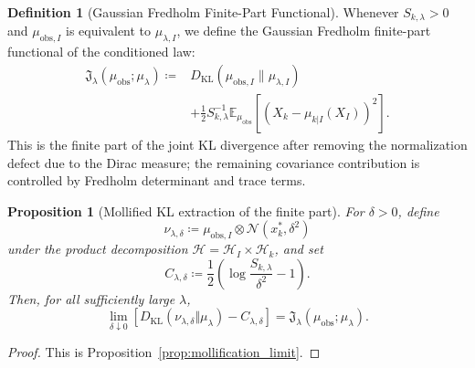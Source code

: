 \documentclass[preprint,12pt]{elsarticle}
\theoremstyle{plain}
\newtheorem{proposition}[theorem]{Proposition}
\theoremstyle{definition}
\newtheorem{definition}[theorem]{Definition}
\theoremstyle{remark}
\newcommand{\KL}{D_{\operatorname{KL}}}
\newcommand{\E}{\mathbb{E}}
\begin{document}
    \begin{definition}[Gaussian Fredholm Finite-Part Functional]
        \label{def:unified_action}
        Whenever $S_{k,\lambda}>0$ and $\mu_{\text{obs},I}$ is equivalent to $\mu_{\lambda,I}$, we define the Gaussian Fredholm finite-part functional of the conditioned law:
        \begin{equation}
            \label{eq:unified_action}
            \begin{aligned}
                \mathfrak{J}_\lambda(\mu_{\mathrm{obs}}; \mu_\lambda) \coloneqq &\KL(\mu_{\mathrm{obs},I} \parallel \mu_{\lambda,I}) \\
                &+ \frac{1}{2} S_{k,\lambda}^{-1} \E_{\mu_{\mathrm{obs}}}\left[ \left( X_k - \mu_{k|I}(X_I) \right)^2 \right].
            \end{aligned}
        \end{equation}
        This is the finite part of the joint KL divergence after removing the normalization defect due to the Dirac measure; the remaining covariance contribution is controlled by Fredholm determinant and trace terms.
    \end{definition}

    \begin{proposition}[Mollified KL extraction of the finite part]
        \label{prop:mollified_kl_extraction_main}
        For $\delta>0$, define
        \[
            \nu_{\lambda,\delta}
            \coloneqq
            \mu_{\mathrm{obs},I}\otimes \mathcal{N}(x_k^*,\delta^2)
        \]
        under the product decomposition
        $\mathcal{H}=\mathcal{H}_I\times\mathcal{H}_k$, and set
        \[
            C_{\lambda,\delta}
            \coloneqq
            \frac12\left(\log\frac{S_{k,\lambda}}{\delta^2}-1\right).
        \]
        Then, for all sufficiently large $\lambda$,
        \begin{equation}
            \lim_{\delta\downarrow0}
            \left[
                \KL(\nu_{\lambda,\delta}\Vert\mu_\lambda)
                -C_{\lambda,\delta}
            \right]
            =
            \mathfrak{J}_\lambda(\mu_{\mathrm{obs}};\mu_\lambda).
        \end{equation}
    \end{proposition}
    \begin{proof}
        This is Proposition~\ref{prop:mollification_limit}.
    \end{proof}
\end{document}
